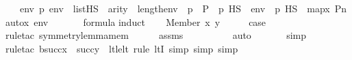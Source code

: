 \begin{isabellebody}
\ \ \ {\isachardoublequoteopen}{\isasymAnd}env\ p{\isachardot}{\kern0pt}\ env\ {\isasymin}\ list{\isacharparenleft}{\kern0pt}HS{\isacharparenright}{\kern0pt}\ {\isasymLongrightarrow}\ arity{\isacharparenleft}{\kern0pt}{\isasymphi}{\isacharparenright}{\kern0pt}\ {\isasymle}\ length{\isacharparenleft}{\kern0pt}env{\isacharparenright}{\kern0pt}\ {\isasymLongrightarrow}\ p\ {\isasymin}\ P\ {\isasymLongrightarrow}\ p\ {\isasymtturnstile}HS\ {\isasymphi}\ env\ {\isasymlongleftrightarrow}\ {\isasympi}{\isacharbackquote}{\kern0pt}p\ {\isasymtturnstile}HS\ {\isasymphi}\ map{\isacharparenleft}{\kern0pt}{\isasymlambda}x{\isachardot}{\kern0pt}\ Pn{\isacharunderscore}{\kern0pt}auto{\isacharparenleft}{\kern0pt}{\isasympi}{\isacharparenright}{\kern0pt}{\isacharbackquote}{\kern0pt}x{\isacharcomma}{\kern0pt}\ env{\isacharparenright}{\kern0pt}{\isachardoublequoteclose}\ \isanewline
%
\isadelimproof
\ \ %
\endisadelimproof
%
\isatagproof
{}\isamarkupfalse%
\ {\isacartoucheopen}{\isasymphi}\ {\isasymin}\ formula{\isacartoucheclose}\isanewline
{}\isamarkupfalse%
{\isacharparenleft}{\kern0pt}induct{\isacharparenright}{\kern0pt}\isanewline
\ \ \isamarkupfalse%
\ {\isacharparenleft}{\kern0pt}Member\ x\ y{\isacharparenright}{\kern0pt}\isanewline
\ \ \isamarkupfalse%
\ \isamarkupfalse%
\ {\isacharquery}{\kern0pt}case\ \isanewline
\ \ \ \ \isamarkupfalse%
{\isacharparenleft}{\kern0pt}rule{\isacharunderscore}{\kern0pt}tac\ symmetry{\isacharunderscore}{\kern0pt}lemma{\isacharunderscore}{\kern0pt}mem{\isacharparenright}{\kern0pt}\isanewline
\ \ \ \ \isamarkupfalse%
\ assms\isanewline
\ \ \ \ \ \ \ \ \isamarkupfalse%
\ auto{\isacharbrackleft}{\kern0pt}{}{\isacharbrackright}{\kern0pt}\isanewline
\ \ \ \ \ \isamarkupfalse%
\ simp\isanewline
\ \ \ \ \ \isamarkupfalse%
{\isacharparenleft}{\kern0pt}rule{\isacharunderscore}{\kern0pt}tac\ b{\isacharequal}{\kern0pt}{\isachardoublequoteopen}succ{\isacharparenleft}{\kern0pt}x{\isacharparenright}{\kern0pt}\ {\isasymunion}\ succ{\isacharparenleft}{\kern0pt}y{\isacharparenright}{\kern0pt}{\isachardoublequoteclose}\ \ lt{\isacharunderscore}{\kern0pt}le{\isacharunderscore}{\kern0pt}lt{\isacharcomma}{\kern0pt}\ rule\ ltI{\isacharcomma}{\kern0pt}\ simp{\isacharcomma}{\kern0pt}\ simp{\isacharcomma}{\kern0pt}\ simp{\isacharparenright}{\kern0pt}{\isacharplus}{\kern0pt}\isanewline
\ \ \ \ \isamarkupfalse%
\isanewline
{}\isamarkupfalse%

\end{isabellebody}
